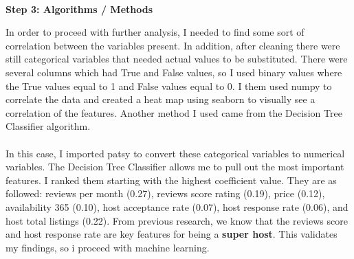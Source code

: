 \documentclass[10pt,letterpapter]{article}
\begin{document}
\indent \\
\textbf{Step 3: Algorithms / Methods} 
\begin{paragraph}
\indent
In order to proceed with further analysis, I needed to find some sort of correlation between the variables present. In addition, after cleaning there were still categorical variables that needed actual values to be substituted. There were several columns which had True and False values, so I used binary values where the True values equal to 1 and False values equal to 0. I them used numpy to correlate the data and created a heat map using seaborn to visually see a correlation of the features. Another method I used came from the Decision Tree Classifier algorithm.
\\ \\ 
\indent \indent In this case, I imported patsy to convert these categorical variables to numerical variables. The Decision Tree Classifier allows me to pull out the most important features. I ranked them starting with the highest coefficient value. They are as followed: reviews per month (0.27), reviews score rating (0.19), price (0.12), availability 365 (0.10), host acceptance rate (0.07), host response rate (0.06), and host total listings (0.22). From previous research, we know that the reviews score and host response rate are key features for being a \textbf{super host}. This validates my findings, so i proceed with machine learning.
\\


\end{paragraph}
\end{document}
